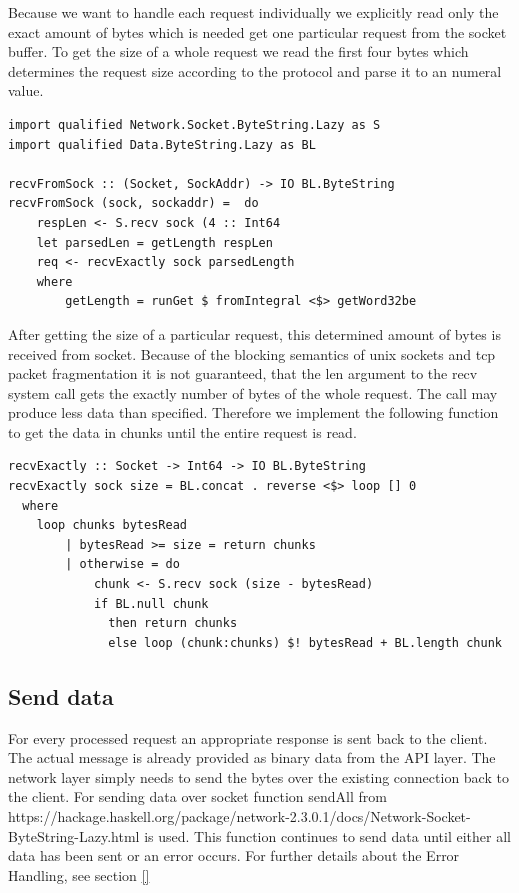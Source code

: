 Because we want to handle each request individually we explicitly read
only the exact amount of bytes which is needed get one particular request from
the socket buffer. To get the size of a whole request we read the first four
bytes which determines the request size according to the protocol and parse it
to an numeral value.

\begin{lstlisting}
import qualified Network.Socket.ByteString.Lazy as S 
import qualified Data.ByteString.Lazy as BL

recvFromSock :: (Socket, SockAddr) -> IO BL.ByteString
recvFromSock (sock, sockaddr) =  do 
    respLen <- S.recv sock (4 :: Int64
    let parsedLen = getLength respLen
    req <- recvExactly sock parsedLength 
    where
        getLength = runGet $ fromIntegral <$> getWord32be
\end{lstlisting}

After getting the size of a particular request, this determined amount of bytes
is received from socket. Because of the blocking semantics of unix sockets and
tcp packet fragmentation it is not guaranteed, that the len argument to the recv
system call gets the exactly number of bytes of the whole request. The call may produce
less data than specified. Therefore we implement the following function to get
the data in
chunks until the entire request is read. 

\begin{lstlisting}
recvExactly :: Socket -> Int64 -> IO BL.ByteString 
recvExactly sock size = BL.concat . reverse <$> loop [] 0 
  where
    loop chunks bytesRead
        | bytesRead >= size = return chunks
        | otherwise = do  
            chunk <- S.recv sock (size - bytesRead)
            if BL.null chunk 
              then return chunks 
              else loop (chunk:chunks) $! bytesRead + BL.length chunk 
\end{lstlisting}

\subsection{Send data}
\label{sec:impl-broker-socket-send}
For every processed request an appropriate response is sent back to the client.
The actual message is already provided as binary data from the API layer. The
network layer simply needs to send the bytes over the existing connection back
to the client. For sending data over socket function sendAll from 
{https://hackage.haskell.org/package/network-2.3.0.1/docs/Network-Socket-ByteString-Lazy.html}
is used. This function continues to send data until either all data has been
sent or an error occurs. For further details about the Error Handling, see
section \ref{}

